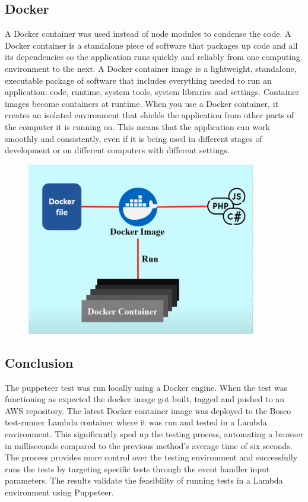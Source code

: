 \documentclass[12pt,a4paper,titlepage]{report}
\begin{document}
\subsection{Docker}
 
A Docker container was used instead of node modules to condense the code. A Docker
container is a standalone piece of software that packages up code and all its dependencies so the application runs quickly and reliably from one computing environment to the next.
A Docker container image is a lightweight, standalone, executable package of software that includes everything needed to run an application: code, runtime, system tools, system libraries and settings.
Container images become containers at runtime. When you use a Docker container, it creates an isolated environment that shields the application from other parts of the computer it is running on. This 
means that the application can work smoothly and consistently, even if it is being used in different stages of development or on different computers with different settings.

\begin{figure}[H]
  \centering
  \includegraphics[width=10cm]{./diagrams/dockerexplained.png}
 \end{figure}

\subsection{Conclusion}
The puppeteer test was run locally using a Docker engine. When the test was functioning as expected the docker image got built, tagged and pushed to an AWS repository. 
The latest Docker container image was deployed to the Bosco test-runner Lambda container where it was run and tested in a Lambda environment.
This significantly sped up the testing process, automating a browser in milliseconds compared to the previous method's average time of six seconds.
The process provides more control over the testing environment and successfully runs the tests by targeting specific tests through the event handler input parameters.
The results validate the feasibility of running tests in a Lambda environment using Puppeteer.
\end{document}
